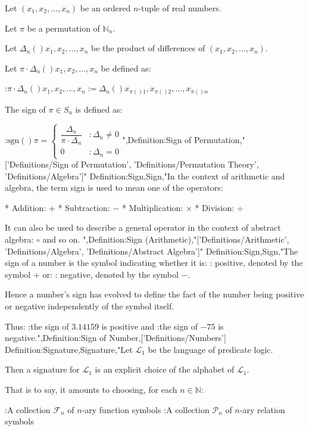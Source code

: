 Let $\left( x_1, x_2, \ldots, x_n \right)$ be an ordered $n$-tuple of real numbers.

Let $\pi$ be a permutation of $\mathbb N_n$.

Let $\Delta_n \left(   \right){x_1, x_2, \ldots, x_n}$ be the product of differences of $\left( x_1, x_2, \ldots, x_n \right)$.

Let $\pi \cdot \Delta_n \left(   \right){x_1, x_2, \ldots, x_n}$ be defined as:

:$\pi \cdot \Delta_n \left(   \right){x_1, x_2, \ldots, x_n} := \Delta_n \left(   \right){x_{\pi \left(   \right)1}, x_{\pi \left(   \right)2}, \ldots, x_{\pi \left(   \right)n} }$


The sign of $\pi \in S_n$ is defined as:

:$\mathrm {sgn} \left(   \right)\pi = \begin {cases}
\dfrac {\Delta_n} {\pi \cdot \Delta_n} & : \Delta_n \ne 0 \\
0 & : \Delta_n = 0 \end {cases}$",Definition:Sign of Permutation,"['Definitions/Sign of Permutation', 'Definitions/Permutation Theory', 'Definitions/Algebra']"
Definition:Sign,Sign,"In the context of arithmetic and algebra, the term sign is used to mean one of the operators:

* Addition: $+$
* Subtraction: $-$
* Multiplication: $\times$
* Division: $\div$

It can also be used to describe a general operator in the context of abstract algebra: $\circ$ and so on.
",Definition:Sign (Arithmetic),"['Definitions/Arithmetic', 'Definitions/Algebra', 'Definitions/Abstract Algebra']"
Definition:Sign,Sign,"The sign of a number is the symbol indicating whether it is:
: positive, denoted by the symbol $+$
or:
: negative, denoted by the symbol $-$.


Hence a number's sign has evolved to define the fact of the number being positive or negative independently of the symbol itself.


Thus:
:the sign of $3.14159$ is positive
and
:the sign of $-75$ is negative.",Definition:Sign of Number,['Definitions/Numbers']
Definition:Signature,Signature,"Let $\mathcal L_1$ be the language of predicate logic.


Then a signature for $\mathcal L_1$ is an explicit choice of the alphabet of $\mathcal L_1$.

That is to say, it amounts to choosing, for each $n \in \mathbb N$:

:A collection $\mathcal F_n$ of $n$-ary function symbols
:A collection $\mathcal P_n$ of $n$-ary relation symbols

